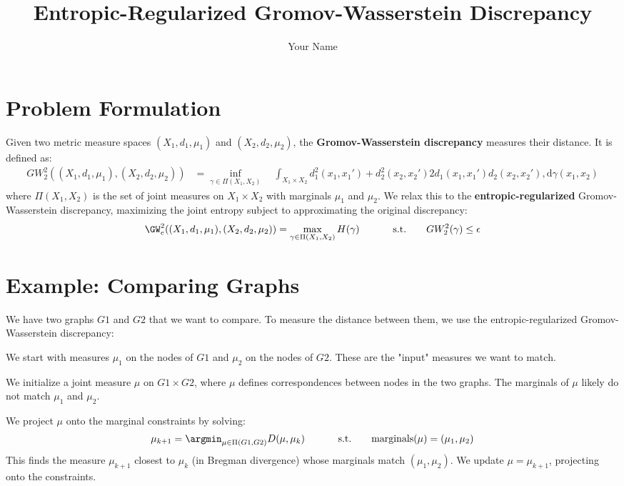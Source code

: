 \documentclass{article}
\begin{document}
\title{Entropic-Regularized Gromov-Wasserstein Discrepancy}
\author{Your Name}
\maketitle

\section{Problem Formulation}
Given two metric measure spaces $(X_1, d_1, \mu_1)$ and $(X_2, d_2, \mu_2)$, the \textbf{Gromov-Wasserstein discrepancy} measures their distance. It is defined as:
\begin{align*}
GW_2^2((X_1, d_1, \mu_1), (X_2,d_2,\mu_2)) &= \inf_{\gamma \in \Pi(X_1,X_2)}\
&\int_{X_1\times X_2} d_1^2(x_1,x_1') + d_2^2(x_2,x_2')

2d_1(x_1,x_1')d_2(x_2,x_2') ,\mathrm{d}\gamma(x_1,x_2)
\end{align*}
where $\Pi(X_1,X_2)$ is the set of joint measures on $X_1 \times X_2$ with marginals $\mu_1$ and $\mu_2$.
We relax this to the \textbf{entropic-regularized} Gromov-Wasserstein discrepancy, maximizing the joint entropy subject to approximating the original discrepancy:
\begin{align*}
\GW_e^2((X_1,d_1,\mu_1),(X_2,d_2,\mu_2)) &= \max_{\gamma \in \Pi(X_1,X_2)} H(\gamma) \
&\qquad \text{s.t.} \qquad GW_2^2(\gamma) \le \epsilon
\end{align*}

\section{Example: Comparing Graphs}
We have two graphs $G1$ and $G2$ that we want to compare. To measure the distance between them, we use the entropic-regularized Gromov-Wasserstein discrepancy:

We start with measures $\mu_1$ on the nodes of $G1$ and $\mu_2$ on the nodes of $G2$. These are the "input" measures we want to match.

We initialize a joint measure $\mu$ on $G1 \times G2$, where $\mu$ defines correspondences between nodes in the two graphs. The marginals of $\mu$ likely do not match $\mu_1$ and $\mu_2$.

We project $\mu$ onto the marginal constraints by solving:
\begin{align*}
\mu_{k+1} &= \argmin_{\mu \in \Pi(G1,G2)} D(\mu, \mu_k) \
&\qquad \text{s.t.} \qquad \text{marginals}(\mu) = (\mu_1, \mu_2)
\end{align*}
This finds the measure $\mu_{k+1}$ closest to $\mu_k$ (in Bregman divergence) whose marginals match $(\mu_1, \mu_2)$. We update $\mu = \mu_{k+1}$, projecting onto the constraints.
\end{document}

